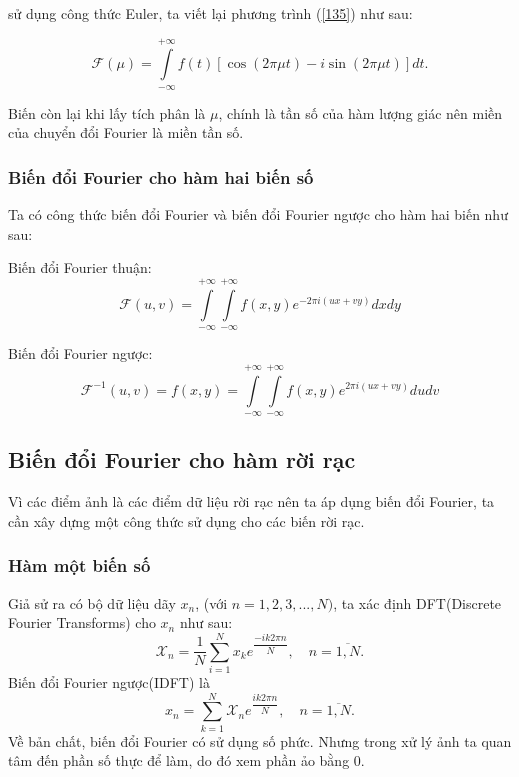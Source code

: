 \documentclass[12pt,a4paper]{report}
\numberwithin{equation}{section}
\theoremstyle{definition} %
\begin{document}
sử dụng công thức Euler, ta viết lại phương trình (\ref{135}) như sau:

\begin{equation}
	\label{137}
     \mathcal{F}(\mu)=\int\limits_{-\infty}^{+\infty}f(t)[\cos(2\pi\mu t)-i\sin(2\pi\mu t)]dt.
\end{equation}

Biến còn lại khi lấy tích phân là $\mu$, chính là tần số của hàm lượng giác nên miền của chuyển đổi Fourier là miền tần số.

\subsubsection{Biến đổi Fourier cho hàm hai biến số}

Ta có công thức biến đổi Fourier và biến đổi Fourier ngược cho hàm hai biến như sau:

Biến đổi Fourier thuận:
\begin{equation}
\mathcal{F}(u,v) = \int\limits_{-\infty}^{+\infty}\int\limits_{-\infty}^{+\infty}f(x,y)e^{-2\pi i(ux+vy)}dxdy
\end{equation}

Biến đổi Fourier ngược:
\begin{equation}
\mathcal{F}^{-1}(u,v) =f(x,y)= \int\limits_{-\infty}^{+\infty}\int\limits_{-\infty}^{+\infty}f(x,y)e^{2\pi i(ux+vy)}dudv
\end{equation}



\subsection{Biến đổi Fourier cho hàm rời rạc}

Vì các điểm ảnh là các điểm dữ liệu rời rạc nên ta áp dụng biến đổi Fourier, ta cần xây dựng một công thức sử dụng cho các biến rời rạc.

\subsubsection{Hàm một biến số}

Giả sử ra có bộ dữ liệu dãy $x_n$, (với $n= 1,2,3,...,N)$, ta xác định DFT(Discrete Fourier Transforms) cho $x_n$ như sau: 
\begin{equation}
	\label{144}
    \mathcal{X}_n= \dfrac{1}{N}\sum_{i=1}^Nx_ke^{\dfrac{-ik2\pi n}{N}},\quad n=\overline{1,N}.
\end{equation}
Biến đổi Fourier ngược(IDFT) là
\begin{equation}
	\label{145}
    x_n =\sum_{k=1}^N\mathcal{X}_ne^{\dfrac{ik2\pi n}{N}},\quad n=\overline{1,N}.
\end{equation}
Về bản chất, biến đổi Fourier có sử dụng số phức. Nhưng trong xử lý ảnh ta quan tâm đến phần số thực để làm, do đó xem phần ảo bằng $0$.
\end{document}
